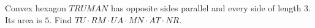 Convex hexagon $TRUMAN$ has opposite sides parallel and every side of length $3$. Its area is $5$. Find $TU\cdot RM\cdot UA\cdot MN\cdot AT\cdot NR$.

